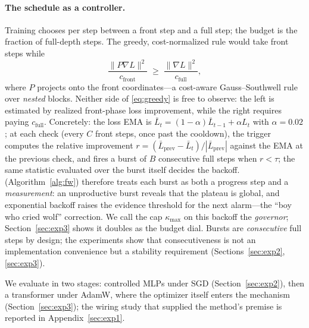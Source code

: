 \paragraph{The schedule as a controller.} Training chooses per step between
a front step and a full step; the budget is the fraction of full-depth
steps. The greedy, cost-normalized rule would take front steps while
\begin{equation}
\frac{\|P\nabla L\|^2}{c_{\mathrm{front}}} \;\ge\;
\frac{\|\nabla L\|^2}{c_{\mathrm{full}}},
\label{eq:greedy}
\end{equation}
where $P$ projects onto the front coordinates---a cost-aware
Gauss--Southwell rule over \emph{nested} blocks. Neither side of
\eqref{eq:greedy} is free to observe: the left is estimated by realized
front-phase loss improvement, while the right requires paying
$c_{\mathrm{full}}$. Concretely: the loss EMA is $\bar L_t = (1{-}\alpha)\bar L_{t-1} +
\alpha L_t$ with $\alpha = 0.02$; at each check (every $C$ front steps,
once past the cooldown), the trigger computes the relative improvement
$r = (\bar L_{\mathrm{prev}} - \bar L_t)/|\bar L_{\mathrm{prev}}|$
against the EMA at the previous check, and fires a burst of $B$ consecutive
full steps when $r < \tau$; the same statistic evaluated over the burst
itself decides the backoff. \fw{} (Algorithm~\ref{alg:fw}) therefore
treats each burst as both a progress step and a \emph{measurement}: an unproductive
burst reveals that the plateau is global, and exponential backoff raises the
evidence threshold for the next alarm---the ``boy who cried wolf''
correction. We call the cap $\kappa_{\max}$ on this backoff the
\emph{governor}; Section~\ref{sec:exp3} shows it doubles as the budget
dial. Bursts are \emph{consecutive} full steps by design; the
experiments show that consecutiveness is not an implementation convenience
but a stability requirement (Sections~\ref{sec:exp2}, \ref{sec:exp3}).

We evaluate in two stages: controlled MLPs under SGD
(Section~\ref{sec:exp2}), then a transformer under AdamW, where the
optimizer itself enters the mechanism (Section~\ref{sec:exp3}); the wiring
study that supplied the method's premise is reported in
Appendix~\ref{sec:exp1}.

